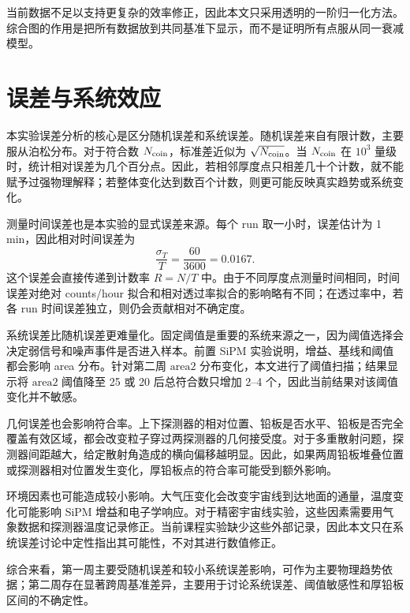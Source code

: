 \documentclass[aps,prl,twocolumn,superscriptaddress,nofootinbib]{revtex4-2}
\begin{document}
当前数据不足以支持更复杂的效率修正，因此本文只采用透明的一阶归一化方法。综合图的作用是把所有数据放到共同基准下显示，而不是证明所有点服从同一衰减模型。


\section{误差与系统效应}

本实验误差分析的核心是区分随机误差和系统误差。随机误差来自有限计数，主要服从泊松分布。对于符合数 $N_{\rm coin}$，标准差近似为 $\sqrt{N_{\rm coin}}$。当 $N_{\rm coin}$ 在 $10^3$ 量级时，统计相对误差为几个百分点。因此，若相邻厚度点只相差几十个计数，就不能赋予过强物理解释；若整体变化达到数百个计数，则更可能反映真实趋势或系统变化。

测量时间误差也是本实验的显式误差来源。每个 run 取一小时，误差估计为 1 min，因此相对时间误差为
\begin{equation}
\frac{\sigma_T}{T}=\frac{60}{3600}=0.0167.
\end{equation}
这个误差会直接传递到计数率 $R=N/T$ 中。由于不同厚度点测量时间相同，时间误差对绝对 counts/hour 拟合和相对透过率拟合的影响略有不同；在透过率中，若各 run 时间误差独立，则仍会贡献相对不确定度。

系统误差比随机误差更难量化。固定阈值是重要的系统来源之一，因为阈值选择会决定弱信号和噪声事件是否进入样本。前置 SiPM 实验说明，增益、基线和阈值都会影响 area 分布。针对第二周 \(\mathrm{area2}\) 分布变化，本文进行了阈值扫描；结果显示将 \(\mathrm{area2}\) 阈值降至 25 或 20 后总符合数只增加 2--4 个，因此当前结果对该阈值变化并不敏感。

几何误差也会影响符合率。上下探测器的相对位置、铅板是否水平、铅板是否完全覆盖有效区域，都会改变粒子穿过两探测器的几何接受度。对于多重散射问题，探测器间距越大，给定散射角造成的横向偏移越明显。因此，如果两周铅板堆叠位置或探测器相对位置发生变化，厚铅板点的符合率可能受到额外影响。

环境因素也可能造成较小影响。大气压变化会改变宇宙线到达地面的通量，温度变化可能影响 SiPM 增益和电子学响应。对于精密宇宙线实验，这些因素需要用气象数据和探测器温度记录修正。当前课程实验缺少这些外部记录，因此本文只在系统误差讨论中定性指出其可能性，不对其进行数值修正。

综合来看，第一周主要受随机误差和较小系统误差影响，可作为主要物理趋势依据；第二周存在显著跨周基准差异，主要用于讨论系统误差、阈值敏感性和厚铅板区间的不确定性。
\end{document}
